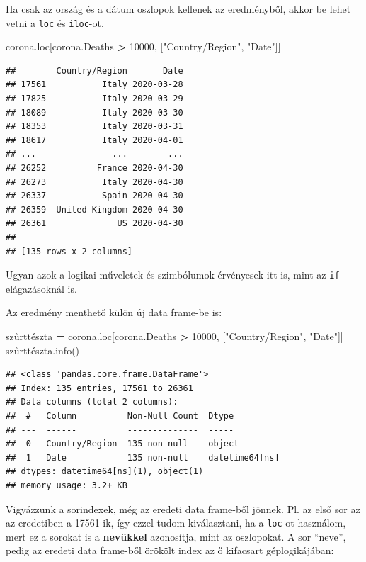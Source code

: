 \documentclass[
]{book}
\newenvironment{Shaded}{\begin{snugshade}}{\end{snugshade}}
\newcommand{\DecValTok}[1]{\textcolor[rgb]{0.00,0.00,0.81}{#1}}
\newcommand{\NormalTok}[1]{#1}
\newcommand{\OperatorTok}[1]{\textcolor[rgb]{0.81,0.36,0.00}{\textbf{#1}}}
\newcommand{\StringTok}[1]{\textcolor[rgb]{0.31,0.60,0.02}{#1}}
\begin{document}
Ha csak az ország és a dátum oszlopok kellenek az eredményből, akkor be lehet vetni a \texttt{loc} és \texttt{iloc}-ot.

\begin{Shaded}
\begin{Highlighting}[]
\NormalTok{corona.loc[corona.Deaths }\OperatorTok{\textgreater{}} \DecValTok{10000}\NormalTok{, [}\StringTok{"Country/Region"}\NormalTok{, }\StringTok{"Date"}\NormalTok{]]}
\end{Highlighting}
\end{Shaded}

\begin{verbatim}
##        Country/Region       Date
## 17561           Italy 2020-03-28
## 17825           Italy 2020-03-29
## 18089           Italy 2020-03-30
## 18353           Italy 2020-03-31
## 18617           Italy 2020-04-01
## ...               ...        ...
## 26252          France 2020-04-30
## 26273           Italy 2020-04-30
## 26337           Spain 2020-04-30
## 26359  United Kingdom 2020-04-30
## 26361              US 2020-04-30
## 
## [135 rows x 2 columns]
\end{verbatim}

Ugyan azok a logikai műveletek és szimbólumok érvényesek itt is, mint az \texttt{if} elágazásoknál is.

Az eredmény menthető külön új data frame-be is:

\begin{Shaded}
\begin{Highlighting}[]
\NormalTok{szűrttészta }\OperatorTok{=}\NormalTok{ corona.loc[corona.Deaths }\OperatorTok{\textgreater{}} \DecValTok{10000}\NormalTok{, [}\StringTok{"Country/Region"}\NormalTok{, }\StringTok{"Date"}\NormalTok{]]}
\NormalTok{szűrttészta.info()}
\end{Highlighting}
\end{Shaded}

\begin{verbatim}
## <class 'pandas.core.frame.DataFrame'>
## Index: 135 entries, 17561 to 26361
## Data columns (total 2 columns):
##  #   Column          Non-Null Count  Dtype         
## ---  ------          --------------  -----         
##  0   Country/Region  135 non-null    object        
##  1   Date            135 non-null    datetime64[ns]
## dtypes: datetime64[ns](1), object(1)
## memory usage: 3.2+ KB
\end{verbatim}

Vigyázzunk a sorindexek, még az eredeti data frame-ből jönnek. Pl. az első sor az az eredetiben a 17561-ik, így ezzel tudom kiválasztani, ha a \texttt{loc}-ot használom, mert ez a sorokat is a \textbf{nevükkel} azonosítja, mint az oszlopokat. A sor ``neve'', pedig az eredeti data frame-ből örökölt index az ő kifacsart géplogikájában:
\end{document}
